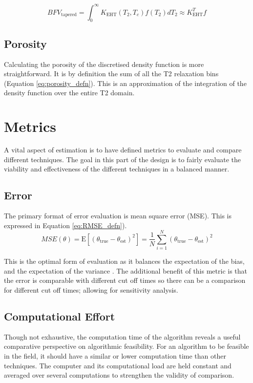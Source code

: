\begin{equation}
    \label{eq:sharpBFVIntegral}
    BFV_{\text{tapered}} = \int^{\infty}_{0} K_{\text{EHT}}(T_2,T_c) f(T_2) dT_2 \approx  K_{\text{EHT}}^T f
\end{equation}


\subsection{Porosity}
Calculating the porosity of the discretised density function is more straightforward. It is by definition the sum of all the T2 relaxation bins (Equation \ref{eq:porosity_defn}). This is an approximation of the integration of the density function over the entire T2 domain.

\section{Metrics}
A vital aspect of estimation is to have defined metrics to evaluate and compare different techniques. The goal in this part of the design is to fairly evaluate the viability and effectiveness of the different techniques in a balanced manner.

\subsection{Error}
The primary format of error evaluation is mean square error (MSE). This is expressed in Equation \ref{eq:RMSE_defn}).
\begin{equation}
    \label{eq:RMSE_defn}
    MSE(\theta) = \text{E} [ (\theta_{\text{true}} -\theta_{\text{est}})^2 ]  = \frac{1}{N} \sum^{N}_{i=1} (\theta_{\text{true}} -\theta_{\text{est}})^2
\end{equation}


This is the optimal form of evaluation as it balances the expectation of the bias, and the expectation of the variance \cite{StatisticsTextbookMSE}. The additional benefit of this metric is that the error is comparable with different cut off times so there can be a comparison for different cut off times; allowing for sensitivity analysis. 

\subsection{Computational Effort}
Though not exhaustive, the computation time of the algorithm reveals a useful comparative perspective on algorithmic feasibility. For an algorithm to be feasible in the field, it should have a similar or lower computation time than other techniques. The computer and its computational load are held constant and averaged over several computations to strengthen the validity of comparison. 




